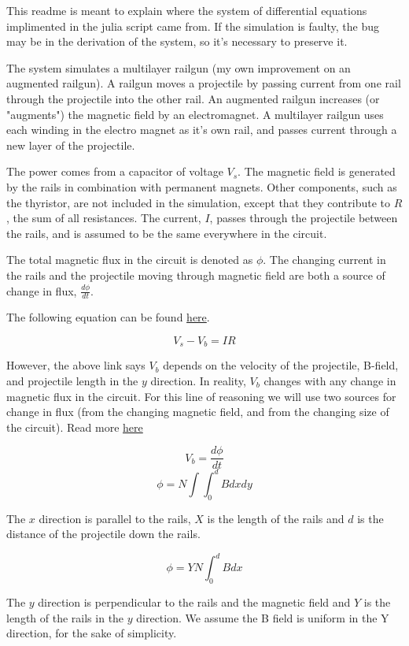\documentclass{article}
\begin{document}
This readme is meant to explain where the system of differential equations implimented in the julia script came from. If the simulation is faulty, the bug may be in the derivation of the system, so it's necessary to preserve it.

The system simulates a multilayer railgun (my own improvement on an augmented railgun). A railgun moves a projectile by passing current from one rail through the projectile into the other rail. An augmented railgun increases (or "augments") the magnetic field by an electromagnet. A multilayer railgun uses each winding in the electro magnet as it's own rail, and passes current through a new layer of the projectile.

The power comes from a capacitor of voltage $V_s$. The magnetic field is generated by the rails in combination with permanent magnets. Other components, such as the thyristor, are not included in the simulation, except that they contribute to $R$, the sum of all resistances. The current, $I$, passes through the projectile between the rails, and is assumed to be the same everywhere in the circuit.

The total magnetic flux in the circuit is denoted as $\phi$. The changing current in the rails and the projectile moving through magnetic field are both a source of change in flux, $\frac{d\phi}{dt}$.

The following equation can be found \href{https://physics.stackexchange.com/questions/791718/how-to-calculate-impedance-in-a-wire-moving-through-a-magnetic-field}{here}.

\[V_s-V_b=IR\]

However, the above link says $V_b$ depends on the velocity of the projectile, B-field, and projectile length in the $y$ direction. In reality, $V_b$ changes with any change in magnetic flux in the circuit. For this line of reasoning we will use two sources for change in flux (from the changing magnetic field, and from the changing size of the circuit). Read more \href{https://www.maxwells-equations.com/faraday/faradays-law.php}{here}

\[V_b=\frac{d\phi}{dt}\]
\[\phi=N\int\int_0^d Bdxdy\]

The $x$ direction is parallel to the rails, $X$ is the length of the rails and $d$ is the distance of the projectile down the rails.

\[\phi=YN\int_0^d Bdx\]

The $y$ direction is perpendicular to the rails and the magnetic field and $Y$ is the length of the rails in the $y$ direction. We assume the B field is uniform in the Y direction, for the sake of simplicity.
\end{document}
